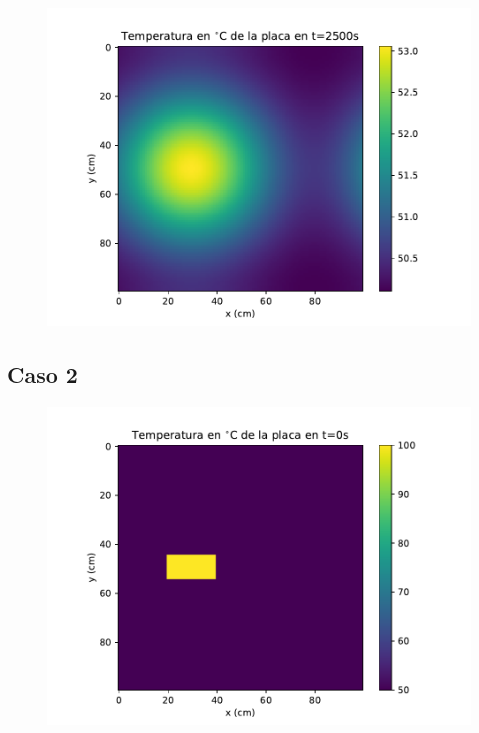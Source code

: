 \documentclass[12pt,letterpaper]{article}
\begin{document}
\begin{figure}[H]
\includegraphics{p1_2500.pdf}
\centering
\end{figure}

\subsection*{Caso 2}

\begin{figure}[H]
\includegraphics{p2_0.pdf}
\centering
\end{figure}
\end{document}
